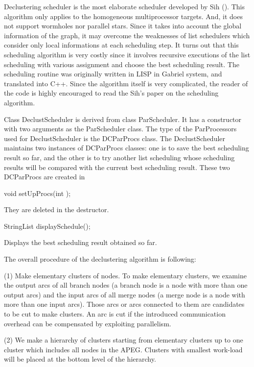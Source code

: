 Declustering scheduler is the most elaborate scheduler developed by Sih
(). This algorithm only applies to the homogeneous
multiprocessor targets. And, it does not support wormholes 
nor parallel stars. Since it takes into account the global information
of the graph, it may overcome the weaknesses of list schedulers which
consider only local informations at each scheduling step. It turns out
that this scheduling algorithm is very costly since it involves
recursive executions of the list scheduling with various assignment
and choose the best scheduling result. The scheduling routine was
originally written in LISP in Gabriel system, and translated into
C++. Since the algorithm itself is very complicated, the reader of the code
is highly encouraged to read the Sih's paper on the scheduling algorithm.

Class DeclustScheduler is derived from class ParScheduler. It has a
constructor with two arguments as the ParScheduler class.
The type of the ParProcessors used for DeclustScheduler is the DCParProcs
class. The DeclustScheduler maintains two instances of DCParProcs classes:
one is to save the best scheduling result so far, and the other is to
try another list scheduling whose scheduling results will be compared with
the current best scheduling result. These two DCParProcs are created in

\begin{example}
void setUpProcs(int );
\end{example}

They are deleted in the destructor.

\begin{example}
StringList displaySchedule();
\end{example}

Displays the best scheduling result obtained so far.

The overall procedure of the declustering algorithm is following:

(1) Make elementary clusters of nodes. To make elementary clusters, we examine
the output arcs of all branch nodes (a branch node is a node with more than
one output arcs) and the input arcs of all merge nodes (a merge node is a
node with more than one input arcs). Those arcs or arcs connected to them
are candidates to be cut to make clusters. An arc is cut if the
introduced communication overhead can be compensated by exploiting
parallelism.

(2) We make a hierarchy of clusters starting from elementary clusters up
to one cluster which includes all nodes in the APEG. Clusters with
smallest work-load will be placed at the bottom level of the hierarchy.

